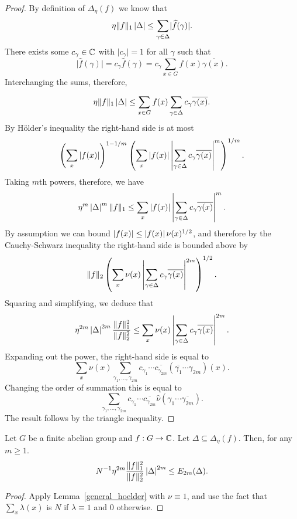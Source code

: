 \begin{proof}
\leanok
By definition of $\Delta_\eta(f)$ we know that
\[\eta\lVert f\rVert_1\left\lvert \Delta\right\rvert\leq \sum_{\gamma\in\Delta} \lvert \widehat{f}(\gamma)\rvert.\]
There exists some $c_\gamma\in\mathbb{C}$ with $\lvert c_\gamma\rvert=1$ for all $\gamma$ such that
\[\lvert \widehat{f}(\gamma)\rvert=c_\gamma\widehat{f}(\gamma)=c_\gamma \sum_{x\in G}f(x)\overline{\gamma(x)}.\]
Interchanging the sums, therefore,

\[\eta\lVert f\rVert_1\left\lvert \Delta\right\rvert\leq \sum_{x\in G}f(x)\sum_{\gamma\in\Delta} c_\gamma \overline{\gamma(x)}.\]
By H\"{o}lder's inequality the right-hand side is at most
\[\left( \sum_x \left\lvert f(x)\right\rvert\right)^{1-1/m}\left( \sum_x \left\lvert f(x)\right\rvert\left\lvert \sum_{\gamma\in\Delta}c_\gamma\overline{\gamma(x)}\right\rvert^m\right)^{1/m}.\]
Taking $m$th powers, therefore, we have
\[\eta^m\left\lvert \Delta\right\rvert^m\lVert f\rVert_1\leq \sum_{x}\left\lvert f(x)\right\rvert\left\lvert \sum_{\gamma\in\Delta}c_\gamma\overline{\gamma(x)}\right\rvert^m.\]
By assumption we can bound $\left\lvert f(x)\right\rvert\leq \left\lvert f(x)\right\rvert\nu(x)^{1/2}$, and therefore by the Cauchy-Schwarz inequality the right-hand side is bounded above by
\[\lVert f\rVert_2\left( \sum_x \nu(x)\left\lvert \sum_{\gamma\in\Delta}c_\gamma\overline{\gamma(x)}\right\rvert^{2m}\right)^{1/2}.\]
Squaring and simplifying, we deduce that
\[\eta^{2m}\left\lvert \Delta\right\rvert^{2m}\frac{\lVert f\rVert_1^2}{\lVert f\rVert_2^2}\leq \sum_x \nu(x)\left\lvert \sum_{\gamma\in\Delta}c_\gamma\overline{\gamma(x)}\right\rvert^{2m}.\]
Expanding out the power, the right-hand side is equal to
\[\sum_x \nu(x)\sum_{\gamma_1,\ldots,\gamma_{2m}}c_{\gamma_1}\cdots \overline{c_{\gamma_{2m}}} (\overline{\gamma_1}\cdots \gamma_{2m})(x).\]
Changing the order of summation this is equal to
\[\sum_{\gamma_1,\ldots,\gamma_{2m}}c_{\gamma_1}\cdots \overline{c_{\gamma_{2m}}}
\widehat{\nu}(\gamma_1\cdots \overline{\gamma_{2m}}).\]
The result follows by the triangle inequality.
\end{proof}


\begin{lemma}
\label{spec_hoelder}
\leanok
Let $G$ be a finite abelian group and $f:G\to\mathbb{C}$. Let $\Delta\subseteq \Delta_\eta(f)$. Then, for any $m\geq 1$.
\[N^{-1}\eta^{2m}\frac{\lVert f\rVert_1^2}{\lVert f\rVert_2^2}\left\lvert \Delta\right\rvert^{2m}\leq E_{2m}(\Delta).\]
\end{lemma}

\begin{proof}
\leanok
Apply Lemma~\ref{general_hoelder} with $\nu\equiv 1$, and use the fact that $\sum_x \lambda(x)$ is $N$ if $\lambda\equiv 1$ and $0$ otherwise.
\end{proof}


